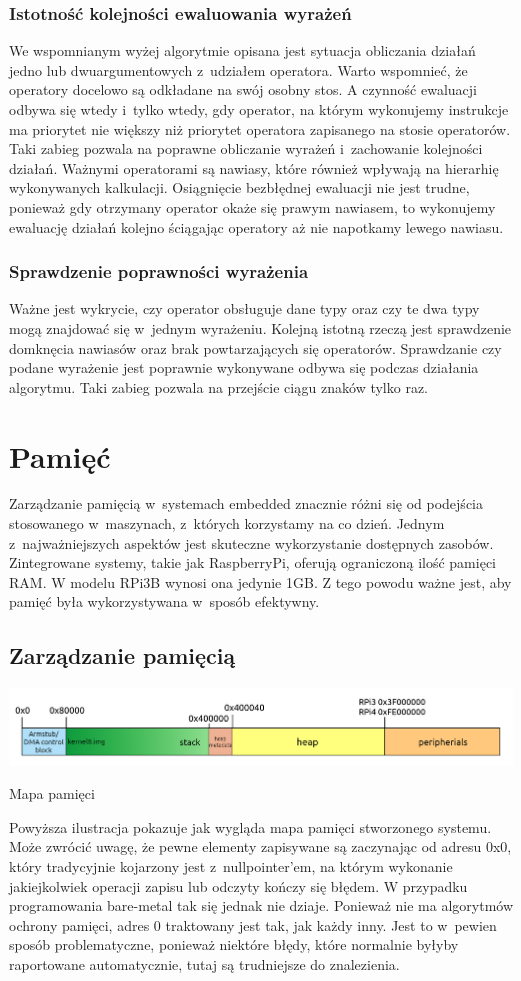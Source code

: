 \documentclass[shortabstract]{iithesis}
\begin{document}
\subsection{Istotność kolejności ewaluowania wyrażeń}
We wspomnianym wyżej algorytmie opisana jest sytuacja obliczania działań jedno lub dwuargumentowych z~udziałem operatora. Warto wspomnieć, że operatory docelowo są odkładane na swój osobny stos. A czynność ewaluacji odbywa się wtedy i~tylko wtedy, gdy operator, na którym wykonujemy instrukcje ma priorytet nie większy niż priorytet operatora zapisanego na stosie operatorów. Taki zabieg pozwala na poprawne obliczanie wyrażeń i~zachowanie kolejności działań. Ważnymi operatorami są nawiasy, które również wpływają na hierarhię wykonywanych kalkulacji. Osiągnięcie bezbłędnej ewaluacji nie jest trudne, ponieważ gdy otrzymany operator okaże się prawym nawiasem, to wykonujemy ewaluację działań kolejno ściągając operatory aż nie napotkamy lewego nawiasu.
\subsection{Sprawdzenie poprawności wyrażenia}
Ważne jest wykrycie, czy operator obsługuje dane typy oraz czy te dwa typy mogą znajdować się w~jednym wyrażeniu. Kolejną istotną rzeczą jest sprawdzenie domknęcia nawiasów oraz brak powtarzających się operatorów. Sprawdzanie czy podane wyrażenie jest poprawnie wykonywane odbywa się podczas działania algorytmu. Taki zabieg pozwala na przejście ciągu znaków tylko raz.


\chapter{Pamięć}
Zarządzanie pamięcią w~systemach embedded znacznie różni się od podejścia stosowanego w~maszynach, z~których korzystamy na co dzień. Jednym z~najważniejszych aspektów jest skuteczne wykorzystanie dostępnych zasobów. Zintegrowane systemy, takie jak RaspberryPi, oferują ograniczoną ilość pamięci RAM. W modelu RPi3B wynosi ona jedynie 1GB. Z tego powodu ważne jest, aby pamięć była wykorzystywana w~sposób efektywny.
\section{Zarządzanie pamięcią}
\begingroup
\centering
\includegraphics[width=\textwidth]{memorymap.png}
\captionsetup{type=figure}
\caption{Mapa pamięci}
\endgroup
Powyższa ilustracja pokazuje jak wygląda mapa pamięci stworzonego systemu. Może zwrócić uwagę, że pewne elementy zapisywane są zaczynając od adresu 0x0, który tradycyjnie kojarzony jest z~nullpointer'em, na którym wykonanie jakiejkolwiek operacji zapisu lub odczyty kończy się błędem. W przypadku programowania bare-metal tak się jednak nie dziaje. Ponieważ nie ma algorytmów ochrony pamięci, adres 0 traktowany jest tak, jak każdy inny. Jest to w~pewien sposób problematyczne, ponieważ niektóre błędy, które normalnie byłyby raportowane automatycznie, tutaj są trudniejsze do znalezienia.
\end{document}
